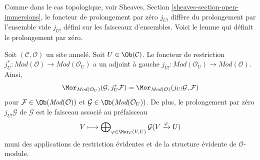 \noindent
Comme dans le cas topologique, voir
Sheaves, Section \ref{sheaves-section-open-immersions},
le foncteur de prolongement par zéro $j_{U!}$ diffère du
prolongement par l'ensemble vide $j_{U!}$ défini sur les faisceaux
d'ensembles. Voici le lemme qui définit le prolongement par zéro.

\begin{lemma}
\label{lemma-extension-by-zero}
Soit $(\mathcal{C}, \mathcal{O})$ un site annelé.
Soit $U \in \Ob(\mathcal{C})$.
Le foncteur de restriction
$j_U^* : \textit{Mod}(\mathcal{O}) \to \textit{Mod}(\mathcal{O}_U)$
a un adjoint à gauche
$j_{U!} : \textit{Mod}(\mathcal{O}_U) \to \textit{Mod}(\mathcal{O})$.
Ainsi,
$$
\Mor_{\textit{Mod}(\mathcal{O}_U)}(\mathcal{G}, j_U^*\mathcal{F})
=
\Mor_{\textit{Mod}(\mathcal{O})}(j_{U!}\mathcal{G}, \mathcal{F})
$$
pour $\mathcal{F} \in \Ob(\textit{Mod}(\mathcal{O}))$
et $\mathcal{G} \in \Ob(\textit{Mod}(\mathcal{O}_U))$.
De plus, le prolongement par zéro $j_{U!}\mathcal{G}$ de $\mathcal{G}$
est le faisceau associé au préfaisceau
$$
V
\longmapsto
\bigoplus\nolimits_{\varphi \in \Mor_\mathcal{C}(V, U)}
\mathcal{G}(V \xrightarrow{\varphi} U)
$$
muni des applications de restriction évidentes et de la structure
évidente de $\mathcal{O}$-module.
\end{lemma}


